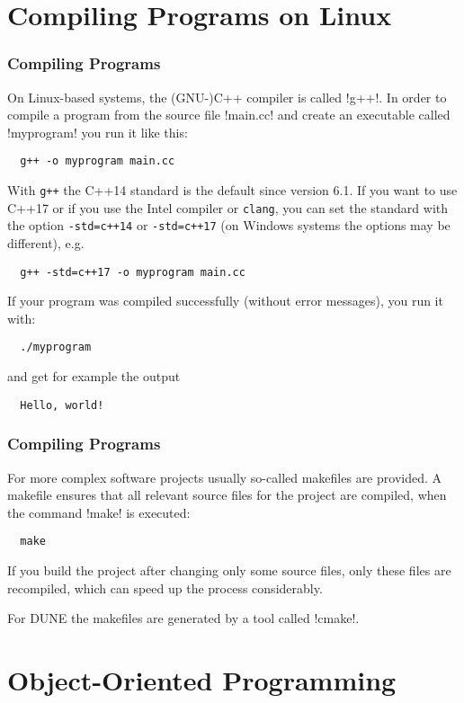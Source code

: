 \section{Compiling Programs on Linux}
\begin{frame}[fragile]
  \frametitle<presentation>{Compiling Programs}
  On Linux-based systems, the (GNU-)C++ compiler is called \inline!g++!. In order to compile a program from the source file \inline!main.cc! and create an executable called \inline!myprogram! you run it like this:
  \begin{lstlisting}
  g++ -o myprogram main.cc
  \end{lstlisting}
With \lstinline!g++! the C++14 standard is the default since version 6.1. If you want to use C++17 or if you use the Intel compiler or \lstinline!clang!, you can set the standard with the option \lstinline!-std=c++14! or \lstinline!-std=c++17! (on Windows systems the options may be different), e.g.
  \begin{lstlisting}
  g++ -std=c++17 -o myprogram main.cc
  \end{lstlisting}

If your program was compiled successfully (without error messages), you run it with:
  \begin{lstlisting}
  ./myprogram
  \end{lstlisting}
and get for example the output
  \begin{lstlisting}
  Hello, world!
  \end{lstlisting}
\end{frame}

\begin{frame}[fragile]
  \frametitle<presentation>{Compiling Programs}
  For more complex software projects usually so-called makefiles are provided. A makefile ensures that all relevant source files for the project are compiled, when the command \inline!make! is executed:
  \begin{lstlisting}
  make
  \end{lstlisting}
  If you build the project after changing only some source files, only these files are recompiled, which can speed up the process considerably.
  
  For DUNE the makefiles are generated by a tool called \inline!cmake!.
\end{frame}

\section{Object-Oriented Programming}


